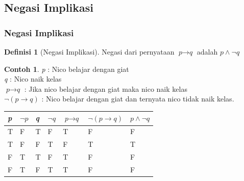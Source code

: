 \documentclass[handout]{beamer}
\theoremstyle{definition}
\newtheorem{definisi}[theorem]{Definisi}
\theoremstyle{example}
\newtheorem{contoh}[theorem]{Contoh}
\begin{document}
\subsection{Negasi Implikasi}
\begin{frame}
	\frametitle{Negasi Implikasi}
 \begin{definisi}[Negasi Implikasi]
 	Negasi dari pernyataan $\textit{p}\rightarrow\textit{q}$  adalah $\textit{p}\wedge\neg\textit{q}$    		 	
 \end{definisi}
 \begin{contoh}
 	\textit{p} : Nico belajar dengan giat \\
 	\textit{q} : Nico naik kelas \\
 	$\textit{p}\rightarrow\textit{q}$ : Jika nico belajar dengan giat maka nico naik kelas\\
 	$\neg(\textit{p}\rightarrow\textit{q})$ : Nico belajar dengan giat dan ternyata nico tidak naik kelas.	\\
 	
 	\begin{tabular}{ | l | l | l | l | l | l | l |}
 		\hline
 		\textit{p} & $\neg\textit{p}$ & \textit{q} & $\neg\textit{q}$ & $\textit{p}\rightarrow\textit{q}$ & $\neg(\textit{p}\rightarrow\textit{q})$ & $\textit{p}\wedge\neg\textit{q}$ \\ \hline
 		T & F & T & F & T & F & F\\ \hline
 		T & F & F & T & F & T & T \\ \hline
 		F & T & T & F & T & F & F\\ \hline
 		F & T & F & T & T & F & F\\     		 
 		\hline
 	\end{tabular}
 \end{contoh}
\end{frame}
\end{document}
